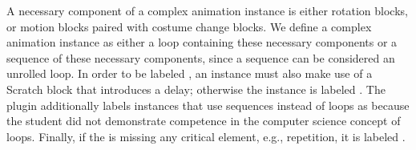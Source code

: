 A necessary component of a complex animation instance is either rotation
blocks, or motion blocks paired with costume change blocks. We define a complex
animation instance as either a loop containing these necessary components or a
sequence of these necessary components, since a sequence can be considered an
unrolled loop. In order to be labeled \correct{}, an instance must also make
use of a Scratch block that introduces a delay; otherwise the instance is
labeled \semincor{}. The plugin additionally labels instances that use
sequences instead of loops as \semincor{} because the student did not
demonstrate competence in the computer science concept of loops. Finally, if
the \sprogram{} is missing any critical element, e.g., repetition, it is
labeled \incom{}.
